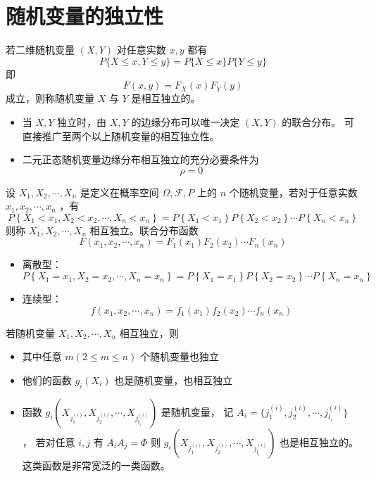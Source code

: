 \section{随机变量的独立性}

 若二维随机变量 $ (X,Y) $ 对任意实数 $ x,y $ 都有
$$ P\{ X \leqslant x, Y \leqslant y \} = P\{ X \leqslant x \} P\{ Y \leqslant y \} $$
即 $$ F(x,y) = F_X(x)F_Y(y) $$
成立，则称随机变量 $ X $ 与 $ Y $ 是相互独立的。

\begin{itemize}[leftmargin=\paritemindent]
    \item 当 $ X,Y $ 独立时，由 $ X,Y $ 的边缘分布可以唯一决定 $ (X,Y) $ 的联合分布。
    可直接推广至两个以上随机变量的相互独立性。
    \item 二元正态随机变量边缘分布相互独立的充分必要条件为 $$ \rho = 0 $$
\end{itemize}

 设 $ X_{1}, X_{2}, \cdots, X_{n} $ 是定义在概率空间 $ \Omega, \mathcal{F}, P $
上的 $ n $ 个随机变量，若对于任意实数 $ x_{1}, x_{2}, \cdots, x_{n} $ ，有
$$ P\left\{ X_{1} < x_1, X_{2} < x_2, \cdots, X_{n} < x_n \right\} = 
P\left\{ X_{1} < x_1 \right\} P\left\{ X_{2} < x_2 \right\} \cdots P\left\{ X_{n} < x_n \right\} $$
则称 $ X_{1}, X_{2}, \cdots, X_{n} $ 相互独立。联合分布函数
$$ F(x_{1}, x_{2}, \cdots, x_{n}) = F_1(x_{1}) F_2(x_{2}) \cdots F_n(x_{n}) $$

\begin{itemize}[leftmargin=\subparitemindent]
    \item 离散型： $$ P\left\{ X_{1}=x_1, X_{2}=x_2, \cdots, X_{n}=x_n \right\} = 
    P\left\{ X_1 = x_1 \right\} P\left\{ X_2 = x_2 \right\} \cdots P\left\{ X_n = x_n \right\}  $$
    \item 连续型： $$ f(x_{1}, x_{2}, \cdots, x_{n}) = f_1(x_1) f_2(x_2) \cdots f_n(x_n) $$
\end{itemize}

 若随机变量 $ X_{1}, X_{2}, \cdots, X_{n} $ 相互独立，则
\begin{itemize}[leftmargin=\subparitemindent]
    \item 其中任意 $ m(2 \leqslant m \leqslant n) $ 个随机变量也独立
    \item 他们的函数 $ g_i(X_i) $ 也是随机变量，也相互独立
    \item 函数 $ g_i(X_{j_{1}^{(i)}}, X_{j_{2}^{(i)}}, \cdots, X_{j_{t_i}^{(i)}}) $ 是随机变量，
    记 $ A_i = \{j_{1}^{(i)}, j_{2}^{(i)}, \cdots, j_{t_i}^{(i)} \} $ ，
    若对任意 $ i,j $ 有 $ A_i A_j = \Phi $
    则 $ g_i(X_{j_{1}^{(i)}}, X_{j_{2}^{(i)}}, \cdots, X_{j_{t_i}^{(i)}}) $ 也是相互独立的。
    这类函数是非常宽泛的一类函数。
\end{itemize}
